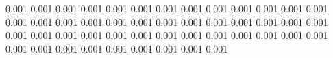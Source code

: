0.001      0.001      %
0.001      0.001      %
0.001      0.001      %
0.001      0.001      %
0.001      0.001      %
0.001      0.001      %
0.001      0.001      %
0.001      0.001      %
0.001      0.001      %
0.001      0.001      %
0.001      0.001      %
0.001      0.001      %
0.001      0.001      %
0.001      0.001      %
0.001      0.001      %
0.001      0.001      %
0.001      0.001      %
0.001      0.001      %
0.001      0.001      %
0.001      0.001      %
0.001      0.001      %
0.001      0.001      %
0.001      0.001      %
0.001      0.001      %
